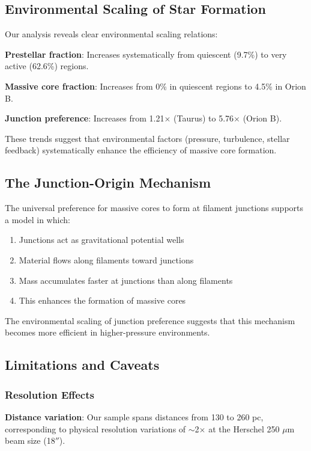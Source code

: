 \documentclass[11pt,a4paper]{article}
\begin{document}
\subsection{Environmental Scaling of Star Formation}

Our analysis reveals clear environmental scaling relations:

\textbf{Prestellar fraction}: Increases systematically from quiescent (9.7\%) to very active (62.6\%) regions.

\textbf{Massive core fraction}: Increases from 0\% in quiescent regions to 4.5\% in Orion B.

\textbf{Junction preference}: Increases from 1.21$\times$ (Taurus) to 5.76$\times$ (Orion B).

These trends suggest that environmental factors (pressure, turbulence, stellar feedback) systematically enhance the efficiency of massive core formation.

\subsection{The Junction-Origin Mechanism}

The universal preference for massive cores to form at filament junctions supports a model in which:
\begin{enumerate}
    \item Junctions act as gravitational potential wells
    \item Material flows along filaments toward junctions
    \item Mass accumulates faster at junctions than along filaments
    \item This enhances the formation of massive cores
\end{enumerate}

The environmental scaling of junction preference suggests that this mechanism becomes more efficient in higher-pressure environments.

\subsection{Limitations and Caveats}

\subsubsection{Resolution Effects}

\textbf{Distance variation}: Our sample spans distances from 130 to 260 pc, corresponding to physical resolution variations of $\sim$2$\times$ at the Herschel 250 $\mu$m beam size (18$''$).
\end{document}
